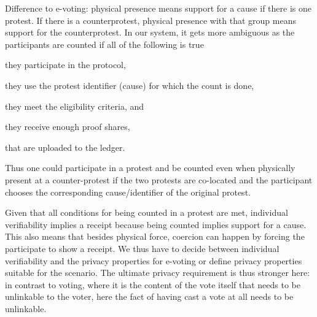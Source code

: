 Difference to e-voting:
physical presence means support for a cause if there is one protest. If there is a counterprotest, physical presence with that group means support for the counterprotest. In our system, it gets more ambiguous as the participants are counted if all of the following is true
\begin{enumerate*}
\item they participate in the protocol,
\item they use the protest identifier (cause) for which the count is done,
\item they meet the eligibility criteria, and
\item they receive enough proof shares,
\item that are uploaded to the ledger.
\end{enumerate*}
Thus one could participate in a protest and be counted even when physically 
present at a counter-protest if the two protests are co-located and the 
participant chooses the corresponding cause/identifier of the original protest.

Given that all conditions for being counted in a protest are met, individual 
verifiability implies a receipt  because being counted implies support for a cause. 
This also means that besides physical force, coercion can happen by forcing the 
participate to show a receipt. 
We thus have to decide between individual verifiability and the privacy 
properties for e-voting or define privacy properties suitable for the scenario. 
The ultimate privacy requirement is thus stronger here: in contrast to voting, 
where it is the content of the vote itself that needs to be unlinkable to the 
voter, here the fact of having cast a vote at all needs to be unlinkable.

